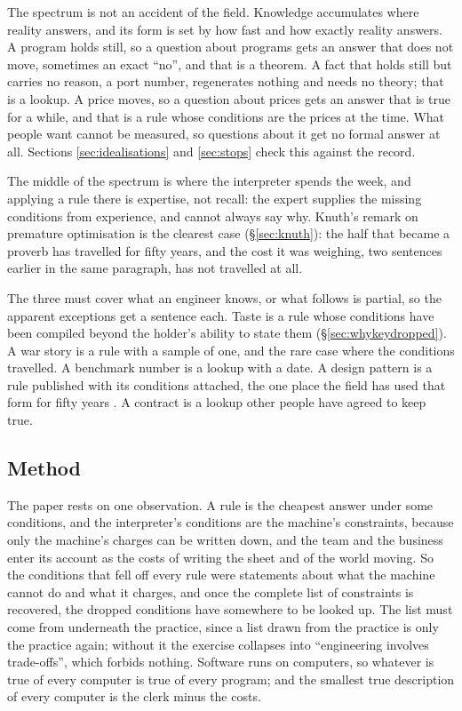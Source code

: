 \documentclass[11pt,oneside]{article}
\theoremstyle{definition}
\theoremstyle{remark}
\begin{document}
The spectrum is not an accident of the field. Knowledge accumulates where reality
answers, and its form is set by how fast and how exactly reality answers. A program holds
still, so a question about programs gets an answer that does not move, sometimes an exact
``no'', and that is a theorem. A fact that holds still but carries no reason, a port
number, regenerates nothing and needs no theory; that is a lookup. A price moves, so a
question about prices gets an answer that is true for a while, and that is a rule whose
conditions are the prices at the time. What people want cannot be measured, so questions
about it get no formal answer at all. Sections \ref{sec:idealisations} and \ref{sec:stops}
check this against the record.

The middle of the spectrum is where the interpreter spends the week, and applying a rule
there is expertise, not recall: the expert supplies the missing conditions from experience,
and cannot always say why. Knuth's remark on premature optimisation is the clearest case
(\S\ref{sec:knuth}): the half that became a proverb has travelled for fifty years, and the
cost it was weighing, two sentences earlier in the same paragraph, has not travelled at
all.

The three must cover what an engineer knows, or what follows is partial, so the
apparent exceptions get a sentence each. Taste is a rule whose conditions have been
compiled beyond the holder's ability to state them (\S\ref{sec:whykeydropped}). A war story
is a rule with a sample of one, and the rare case where the conditions travelled. A
benchmark number is a lookup with a date. A design pattern is a rule published with its
conditions attached, the one place the field has used that form for fifty years
\cite{alexander1977,gamma1994}. A contract is a lookup other people have agreed to keep
true.

\subsection{Method}\label{sec:method}

The paper rests on one observation. A rule is the cheapest answer under some conditions,
and the interpreter's conditions are the machine's constraints, because only the
machine's charges can be written down, and the team and the business enter its account
as the costs of writing the sheet and of the world moving. So the conditions that fell off
every rule were statements about what the machine cannot do and what it charges, and once
the complete list of constraints is recovered, the dropped conditions have somewhere to be
looked up. The list must come from underneath the practice, since a list drawn from the
practice is only the practice again; without it the exercise collapses into ``engineering
involves trade-offs'', which forbids nothing. Software runs on computers, so whatever is
true of every computer is true of every program; and the smallest true description of
every computer is the clerk minus the costs.
\end{document}
